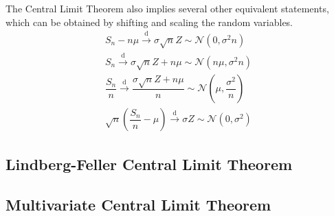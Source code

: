 \documentclass[11pt]{report} %
\begin{document}
The Central Limit Theorem also implies several other equivalent statements, which can be obtained by shifting and scaling the random variables.
\begin{gather}
S_{n} - n\mu \overset{\mathrm{d}}{\to} \sigma\sqrt{n}Z \sim \mathcal{N}\left(0, \sigma^{2}n\right) \\
S_{n} \overset{\mathrm{d}}{\to} \sigma\sqrt{n}Z + n\mu \sim \mathcal{N}\left(n\mu, \sigma^{2}n\right) \\
\dfrac{S_{n}}{n} \overset{\mathrm{d}}{\to} \dfrac{\sigma\sqrt{n}Z + n\mu}{n}\sim \mathcal{N}\left(\mu, \dfrac{\sigma^{2}}{n}\right) \\
\sqrt{n}\left(\dfrac{S_{n}}{n} - \mu\right) \overset{\mathrm{d}}{\to} \sigma Z \sim \mathcal{N}\left(0, \sigma^{2}\right)
\end{gather}

\subsection{Lindberg-Feller Central Limit Theorem}

\subsection{Multivariate Central Limit Theorem \cite{Lehmann1999}}
\end{document}
